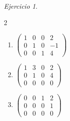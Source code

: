 \documentclass[12pt]{article}
\theoremstyle{remark}
\newtheorem{Ejer}[definicion]{Ejercicio}
\begin{document}
\begin{Ejer}
\begin{multicols}{2}
\begin{enumerate}[resume]
\item $\begin{pmatrix}1&0&0&2\\0&1&0&-1\\0&0&1&4\end{pmatrix}$
\item $\begin{pmatrix}1&3&0&2\\0&1&0&4\\0&0&0&0\end{pmatrix}$
\item $\begin{pmatrix}0&0&1&2\\0&0&0&1\\0&0&0&0\end{pmatrix}$
\end{enumerate}
\end{multicols}
\end{Ejer}
\end{document}
